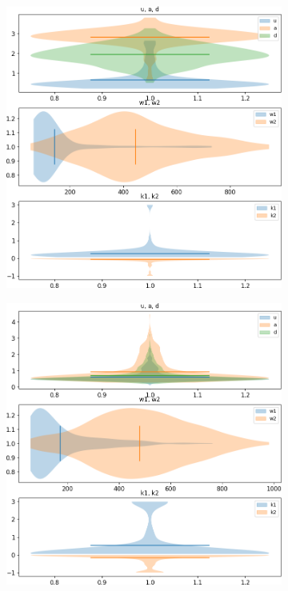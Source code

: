 \begin{figure}[h!]
	\centering
	\begin{subfigure}{0.45\linewidth}
		\includegraphics[width=\textwidth]{fig/parameter_violin_plot_human_pos}
	\end{subfigure}
	\hfill
	\begin{subfigure}{0.45\linewidth}
		\includegraphics[width=\textwidth]{fig/parameter_violin_plot_human_neg}
	\end{subfigure}
	

\end{figure}
